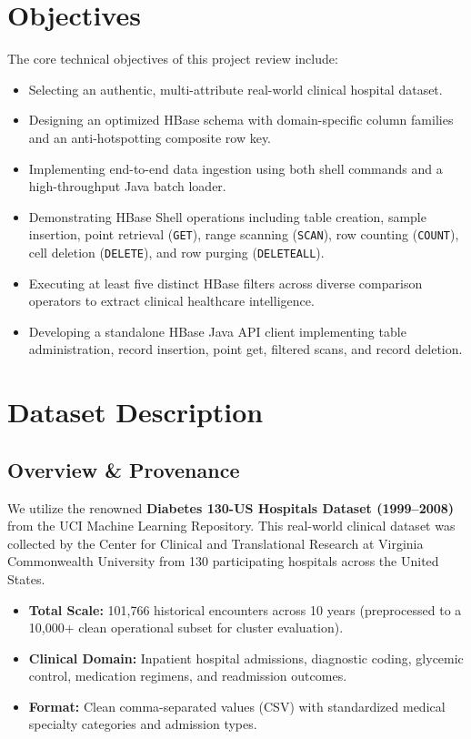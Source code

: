 \documentclass[12pt, a4paper]{article}
\begin{document}
\section{Objectives}
The core technical objectives of this project review include:
\begin{itemize}
    \item Selecting an authentic, multi-attribute real-world clinical hospital dataset.
    \item Designing an optimized HBase schema with domain-specific column families and an anti-hotspotting composite row key.
    \item Implementing end-to-end data ingestion using both shell commands and a high-throughput Java batch loader.
    \item Demonstrating HBase Shell operations including table creation, sample insertion, point retrieval (\texttt{GET}), range scanning (\texttt{SCAN}), row counting (\texttt{COUNT}), cell deletion (\texttt{DELETE}), and row purging (\texttt{DELETEALL}).
    \item Executing at least five distinct HBase filters across diverse comparison operators to extract clinical healthcare intelligence.
    \item Developing a standalone HBase Java API client implementing table administration, record insertion, point get, filtered scans, and record deletion.
\end{itemize}

\section{Dataset Description}
\subsection{Overview \& Provenance}
We utilize the renowned \textbf{Diabetes 130-US Hospitals Dataset (1999--2008)} from the UCI Machine Learning Repository. This real-world clinical dataset was collected by the Center for Clinical and Translational Research at Virginia Commonwealth University from 130 participating hospitals across the United States.
\begin{itemize}
    \item \textbf{Total Scale:} 101,766 historical encounters across 10 years (preprocessed to a 10,000+ clean operational subset for cluster evaluation).
    \item \textbf{Clinical Domain:} Inpatient hospital admissions, diagnostic coding, glycemic control, medication regimens, and readmission outcomes.
    \item \textbf{Format:} Clean comma-separated values (CSV) with standardized medical specialty categories and admission types.
\end{itemize}
\end{document}
